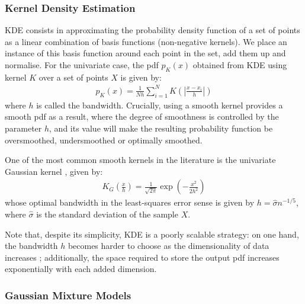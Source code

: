 \documentclass[pdftex,11pt,a4paper]{article}
\theoremstyle{definition}
\theoremstyle{remark}
\begin{document}
\subsubsection{Kernel Density Estimation}
\par KDE consists in approximating the probability density function of a set of points as a linear combination of basis functions (non-negative kernels). We place an instance of this basis function around each point in the set, add them up and normalise. For the univariate case, the pdf $p_K(x)$ obtained from KDE using kernel $K$ over a set of points $X$ is given by:
\begin{align*}
p_K(x) = \frac{1}{Nh}\sum_{i=1}^NK\left(\left|\frac{x - x_i}{h}\right|\right)
\end{align*}
where $h$ is called the bandwidth. Crucially, using a smooth kernel provides a smooth pdf as a result, where the degree of smoothness is controlled by the parameter $h$, and its value will make the resulting probability function be oversmoothed, undersmoothed or optimally smoothed.
\par One of the most common smooth kernels in the literature is the univariate Gaussian kernel \cite{hastie2008}, given by:
\begin{align*}
K_G\left(\frac{x}{h}\right) = \frac{1}{\sqrt{2\pi}}\exp{\left(-\frac{x^2}{2h^2}\right)}
\end{align*}
whose optimal bandwidth in the least-squares error sense is given by $h = \hat{\sigma}n^{-1/5}$, where $\hat{\sigma}$ is the standard deviation of the sample $X$.
\par Note that, despite its simplicity, KDE is a poorly scalable strategy: on one hand, the bandwidth $h$ becomes harder to choose as the dimensionality of data increases \cite{Hansen2009}; additionally, the space required to store the output pdf increases exponentially with each added dimension.

\subsubsection{Gaussian Mixture Models}
\end{document}
